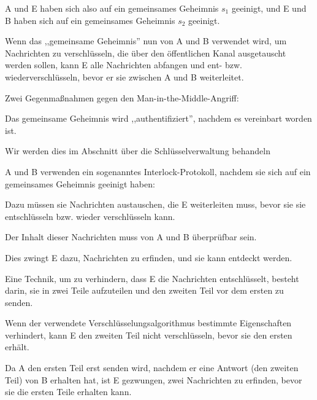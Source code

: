 \documentclass[a4paper]{article}
\begin{document}
\begin{multicols}{3}
\begin{itemize*}
\begin{itemize*}
\begin{itemize*}
                        \item A und E haben sich also auf ein gemeinsames Geheimnis $s_1$ geeinigt, und E und B haben sich auf ein gemeinsames Geheimnis $s_2$ geeinigt.
                  \end{itemize*}
                  \item Wenn das ,,gemeinsame Geheimnis'' nun von A und B verwendet wird, um Nachrichten zu verschlüsseln, die über den öffentlichen Kanal ausgetauscht werden sollen, kann E alle Nachrichten abfangen und ent- bzw. wiederverschlüsseln, bevor er sie zwischen A und B weiterleitet.
            \end{itemize*}
            \item Zwei Gegenmaßnahmen gegen den Man-in-the-Middle-Angriff:
            \begin{itemize*}
                  \item Das gemeinsame Geheimnis wird ,,authentifiziert'', nachdem es vereinbart worden ist.
                  \begin{itemize*}
                        \item Wir werden dies im Abschnitt über die Schlüsselverwaltung behandeln
                  \end{itemize*}
                  \item A und B verwenden ein sogenanntes Interlock-Protokoll, nachdem sie sich auf ein gemeinsames Geheimnis geeinigt haben:
                  \begin{itemize*}
                        \item Dazu müssen sie Nachrichten austauschen, die E weiterleiten muss, bevor sie sie entschlüsseln bzw. wieder verschlüsseln kann.
                        \item Der Inhalt dieser Nachrichten muss von A und B überprüfbar sein.
                        \item Dies zwingt E dazu, Nachrichten zu erfinden, und sie kann entdeckt werden.
                        \item Eine Technik, um zu verhindern, dass E die Nachrichten entschlüsselt, besteht darin, sie in zwei Teile aufzuteilen und den zweiten Teil vor dem ersten zu senden.
                        \begin{itemize*}
                              \item Wenn der verwendete Verschlüsselungsalgorithmus bestimmte Eigenschaften verhindert, kann E den zweiten Teil nicht verschlüsseln, bevor sie den ersten erhält.
                              \item Da A den ersten Teil erst senden wird, nachdem er eine Antwort (den zweiten Teil) von B erhalten hat, ist E gezwungen, zwei Nachrichten zu erfinden, bevor sie die ersten Teile erhalten kann.

\end{itemize*}
\end{itemize*}
\end{itemize*}
\end{itemize*}
\end{multicols}
\end{document}
